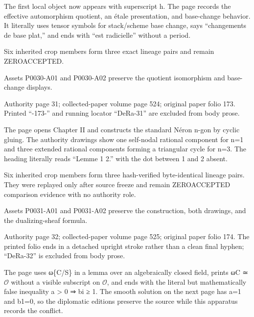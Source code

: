 \documentclass[11pt,a4paper]{article}
\begin{document}
The first local object now appears with superscript h. The page records the effective automorphism quotient, an étale presentation, and base-change behavior. It literally uses tensor symbols for stack/scheme base change, says “changements de base plat,” and ends with “est radicielle” without a period.

Six inherited crop members form three exact lineage pairs and remain ZERO\textunderscore{}ACCEPTED.

Assets P0030-A01 and P0030-A02 preserve the quotient isomorphism and base-change displays.


\par\medskip
\hypertarget{D018-P0031}{}
\par\smallskip
Authority page 31; collected-paper volume page 524; original paper folio 173. Printed “-173-” and running locator “DeRa-31” are excluded from body prose.

The page opens Chapter II and constructs the standard Néron n-gon by cyclic gluing. The authority drawings show one self-nodal rational component for n=1 and three extended rational components forming a triangular cycle for n=3. The heading literally reads “Lemme 1 2.” with the dot between 1 and 2 absent.

Six inherited crop members form three hash-verified byte-identical lineage pairs. They were replayed only after source freeze and remain ZERO\textunderscore{}ACCEPTED comparison evidence with no authority role.

Assets P0031-A01 and P0031-A02 preserve the construction, both drawings, and the dualizing-sheaf formula.


\par\medskip
\hypertarget{D018-P0032}{}
\par\smallskip
Authority page 32; collected-paper volume page 525; original paper folio 174. The printed folio ends in a detached upright stroke rather than a clean final hyphen; “DeRa-32” is excluded from body prose.

The page uses ω\textunderscore{}\{C/S\} in a lemma over an algebraically closed field, prints ω\textunderscore{}C ≃ \ensuremath{\mathcal{O}} without a visible subscript on \ensuremath{\mathcal{O}}, and ends with the literal but mathematically false inequality a > 0 ⇒ b\textunderscore{}i ≥ 1. The smooth solution on the next page has a=1 and b\textunderscore{}1=0, so the diplomatic editions preserve the source while this apparatus records the conflict.
\end{document}
